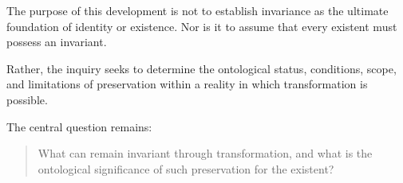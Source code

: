 The purpose of this development is not to establish
invariance as the ultimate foundation of identity
or existence. Nor is it to assume that every existent
must possess an invariant.

Rather, the inquiry seeks to determine the ontological
status, conditions, scope, and limitations of
preservation within a reality in which transformation
is possible.

The central question remains:

\begin{quote}
What can remain invariant through transformation,
and what is the ontological significance of such
preservation for the existent?
\end{quote}

